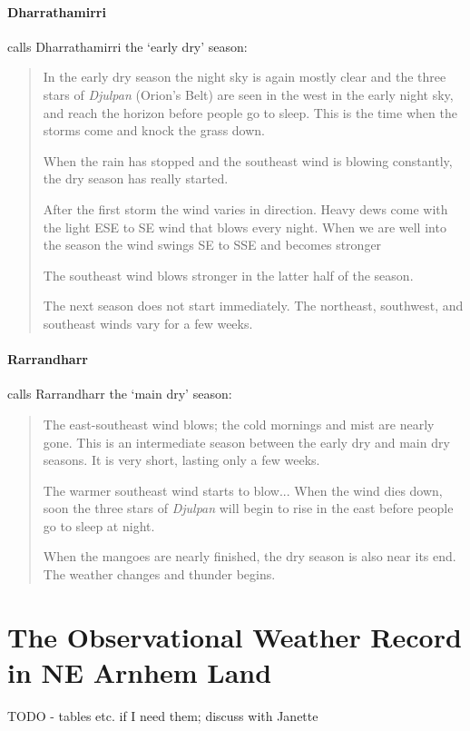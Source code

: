 \paragraph{Dharrathamirri}

\citet{davis1989} calls Dharrathamirri the `early dry' season:
\blockquote{
    In the early dry season the night sky is again mostly clear and the three stars of
    \textit{Djulpan} (Orion's Belt) are seen in the west in the early night sky,
    and reach the horizon before people go to sleep.
    This is the time when the storms come and knock the grass down.
    
    When the rain has stopped and the southeast wind is blowing constantly, the dry season has really started.
    
    After the first storm the wind varies in direction.
    Heavy dews come with the light ESE to SE wind that blows every night.
    When we are well into the season the wind swings SE to SSE and becomes stronger
    
    The southeast wind blows stronger in the latter half of the season.
    
    The next season does not start immediately.
    The northeast, southwest, and southeast winds vary for a few weeks.
}


\paragraph{Rarrandharr}

\citet{davis1989} calls Rarrandharr the `main dry' season:
\blockquote{
    The east-southeast wind blows; the cold mornings and mist are nearly gone.
    This is an intermediate season between the early dry and main dry seasons.
    It is very short, lasting only a few weeks.
    
    The warmer southeast wind starts to blow...
    When the wind dies down, soon the three stars of \textit{Djulpan}
    will begin to rise in the east before people go to sleep at night.
    
    When the mangoes are nearly finished, the dry season is also near its end.
    The weather changes and thunder begins.
}






\section{The Observational Weather Record in NE Arnhem Land}
TODO - tables etc. if I need them; discuss with Janette

